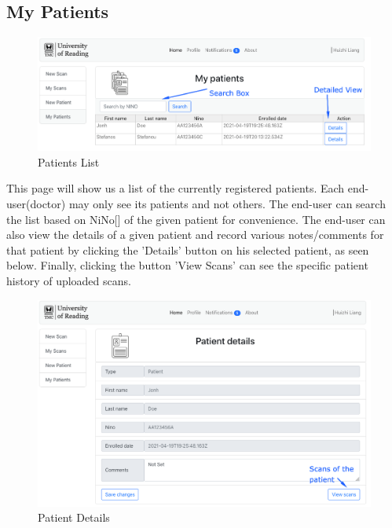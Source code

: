 		\subsection{My Patients}
			\begin{figure}[H]
				\iftrue
				\centering
				\caption{Patients List}
				\includegraphics[scale=0.3]{figures/mypatients}
				\fi
			\end{figure}
			This page will show us a list of the currently registered patients. Each end-user(doctor) may only see its 
			patients and not others. The end-user can search the list based on NiNo[\cite{nino-format}] of the given 
			patient for convenience. The end-user can also view the details of a given patient and record various 
			notes/comments for that patient by clicking the 'Details' button on his selected patient, as seen below. 
			Finally, clicking the button 'View Scans' can see the specific patient history of uploaded scans.
			\begin{figure}[H]
				\iftrue
				\centering
				\caption{Patient Details}
				\includegraphics[scale=0.3]{figures/mypatients2}
				\fi
			\end{figure}
